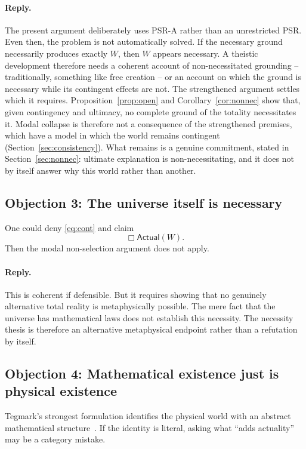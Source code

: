 \documentclass[11pt,letterpaper]{article}
\theoremstyle{plain}
\theoremstyle{definition}
\newcommand{\Actual}{\mathsf{Actual}}
\begin{document}
\paragraph{Reply.} The present argument deliberately uses PSR-A rather than an unrestricted PSR. Even then, the problem is not automatically solved. If the necessary ground necessarily produces exactly $W$, then $W$ appears necessary. A theistic development therefore needs a coherent account of non-necessitated grounding -- traditionally, something like free creation -- or an account on which the ground is necessary while its contingent effects are not. The strengthened argument settles which it requires. Proposition~\ref{prop:open} and Corollary~\ref{cor:nonnec} show that, given contingency and ultimacy, no complete ground of the totality necessitates it. Modal collapse is therefore not a consequence of the strengthened premises, which have a model in which the world remains contingent (Section~\ref{sec:consistency}). What remains is a genuine commitment, stated in Section~\ref{sec:nonnec}: ultimate explanation is non-necessitating, and it does not by itself answer why this world rather than another.

\subsection{Objection 3: The universe itself is necessary}

One could deny \eqref{eq:cont} and claim
\[
  \Box \Actual(W).
\]
Then the modal non-selection argument does not apply.

\paragraph{Reply.} This is coherent if defensible. But it requires showing that no genuinely alternative total reality is metaphysically possible. The mere fact that the universe has mathematical laws does not establish this necessity. The necessity thesis is therefore an alternative metaphysical endpoint rather than a refutation by itself.

\subsection{Objection 4: Mathematical existence just is physical existence}

Tegmark's strongest formulation identifies the physical world with an abstract mathematical structure~\cite{tegmark}. If the identity is literal, asking what ``adds actuality'' may be a category mistake.
\end{document}
